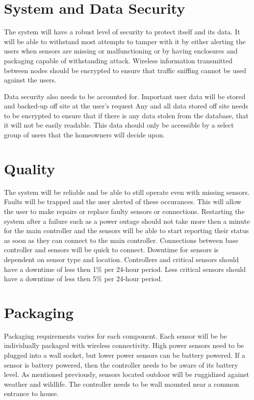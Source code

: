 \documentclass{report}
\begin{document}
\section{System and Data Security}
The system will have a robust level of security to protect itself and its data. It 
will be able to withstand most attempts to tamper with it by either alerting 
the users when sensors are missing or malfunctioning or by having enclosures and 
packaging capable of withstanding attack. Wireless information transmitted between 
nodes should be encrypted to ensure that traffic sniffing cannot be used against the
users.

Data security also needs to be accounted for. Important user data will be stored
and backed-up off site at the user's request Any and all data stored off site
needs to be encrypted to ensure that if there is any data stolen from the
database, that it will not be easily readable. This data should only be
accessible by a select group of users that the homeowners will decide upon.


\section{Quality}
The system will be reliable and be able to still operate even with missing
sensors. Faults will be trapped and the user alerted of these occurances.
This will allow the user to make repairs or replace faulty sensors or
connections. Restarting the system after a failure such as a power outage
should not take more then a minute for the main controller and the sensors
will be able to start reporting their status as soon as they can connect to
the main controller. Connections between base controller and sensors will be
quick to connect. Downtime for sensors is dependent on sensor type and
location. Controllers and critical sensors should have a downtime of less then
1\% per 24-hour period. Less critical sensors should have a downtime of less
then 5\% per 24-hour period. 

\section{Packaging}
Packaging requirements varies for each component. Each sensor will be
be individually packaged with wireless connectivity. High power sensors need to
be plugged into a wall socket, but lower power sensors can be battery powered.
If a sensor is battery powered, then the controller needs to be aware of its
battery level. As mentioned previously, sensors located outdoor will be
ruggidized against weather and wildlife. The controller needs to be wall
mounted near a common entrance to house.
\end{document}
